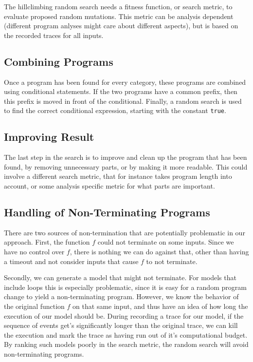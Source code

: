 \documentclass[]{article}
\newcommand{\code}[1]{\lstinline{#1}}
\begin{document}
The hillclimbing random search needs a fitness function, or search metric, to
evaluate proposed random mutations.
This metric can be analysis dependent (different program anlyses might care
about different aspects), but is based on the recorded traces for all inputs.



\subsection{Combining Programs}

Once a program has been found for every category, these programs
are combined using conditional statements.  If the two programs
have a common prefix, then this prefix is moved in front of the conditional.
Finally, a random search is used to find the correct conditional
expression, starting with the constant \code{true}.

\subsection{Improving Result}

The last step in the search is to improve and clean up the program
that has been found, by removing unnecessary parts, or by making it
more readable.  This could involve a different search metric, that for instance
takes program length into account, or some analysis specific metric for what
parts are important.

\subsection{Handling of Non-Terminating Programs}

There are two sources of non-termination that are potentially problematic
in our approach.  First, the function $f$ could not terminate on some inputs.
Since we have no control over $f$, there is nothing we can do against that,
other than having a timeout and not consider inputs that cause $f$ to not terminate.

Secondly, we can generate a model that might not terminate.  For models that
include loops this is especially problematic, since it is easy for
a random program change to yield a non-terminating program.  However, we know
the behavior of the original function $f$ on that same input, and thus
have an idea of how long the execution of our model should be.  During
recording a trace for our model, if the sequence of events get's significantly
longer than the original trace, we can kill the execution and mark the
trace as having run out of it's computational budget.
By ranking such models poorly in the search metric, the random search will
avoid non-terminating programs.
\end{document}
